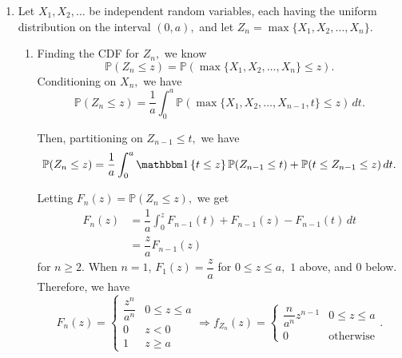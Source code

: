 \documentclass[12pt]{article}
\begin{document}
\begin{enumerate}
\begin{enumerate}
        Once again, by convexity of $f: \mathbb R \to \mathbb R^{+}, \ f(x) = |x|,$ we know
        $$
        \mathbb E[|X_n - X|] \geq |\mathbb E[X_n - X]| = |\mathbb E[X_n] - \mathbb E[X]| \geq 0,
        $$
        and by the squeeze theorem again,
        $$
        \lim_{n \to \infty} |\mathbb E[X_n] - \mathbb E[X]| = 0 \Rightarrow \lim_{n \to \infty} \mathbb E[X_n] = \mathbb E[X]
        $$
        as required. \qed

      \item If $X_n \to X$ in probability, we know for every $\epsilon > 0,$ $$
        \lim_{n \to \infty} \mathbb P(|X_n - X| \geq \epsilon) = 0.
        $$

        Take counterexample $X_n = n$ with probability $1/n,$ and $0$ otherwise. Then, $\mathbb E[X_n] = 1,$ but $X_n$ converges to $0$ in probability. \qed
    \end{enumerate}

  \item Let $X_1, X_2, \ldots$ be independent random variables, each having the uniform distribution on the interval $(0, a),$ and let $Z_n = \max\{X_1, X_2, \ldots, X_n\}.$

    \begin{enumerate}
      \item Finding the CDF for $Z_n,$ we know $$
        \mathbb P(Z_n \leq z) = \mathbb P(\max\{X_1, X_2, \ldots, X_{n}\} \leq z).
        $$
        Conditioning on $X_n,$ we have
        $$
        \mathbb P(Z_n \leq z) =  \dfrac{1}{a}\int_{0}^{a}\mathbb P(\max\{X_1, X_2, \ldots, X_{n-1}, t \}\leq z)\, dt.
        $$

        Then, partitioning on $Z_{n -1} \leq t,$ we have
        $$
        \mathbb P(Z_n \leq z) = \dfrac{1}{a} \int_{0}^{a} \ind{t \leq z} \mathbb P(Z_{n-1} \leq t) + \mathbb P(t \leq Z_{n - 1} \leq z) \, dt.
        $$

        Letting $F_n(z) = \mathbb P(Z_n \leq z),$ we get
        \begin{align*}
          F_n(z) &= \dfrac{1}{a} \int_{0}^{z} F_{n - 1}(t) + F_{n - 1}(z) - F_{n-1}(t) \, dt \\
          &= \dfrac{z}{a} F_{n-1}(z)
        \end{align*}
        for $n \geq 2.$ When $n = 1$, $F_{1}(z) = \dfrac{z}{a}$ for $0 \leq z \leq a,$ $1$ above, and $0$ below. Therefore, we have $$
        F_n(z) =
        \begin{cases}
          \dfrac{z^n}{a^n} & 0 \leq z \leq a \\
          0 & z < 0 \\
          1 & z \geq a
        \end{cases} \Rightarrow f_{Z_n}(z) =
        \begin{cases}
          \dfrac{n}{a^n}z^{n-1} & 0 \leq z \leq a \\
          0 & \text{otherwise}
        \end{cases}.
        $$


\end{enumerate}
\end{enumerate}
\end{document}
